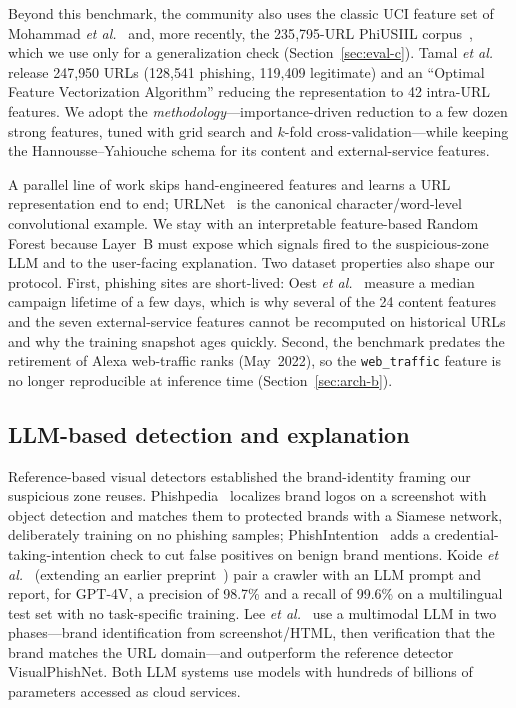 \documentclass[conference]{IEEEtran}
\begin{document}
Beyond this benchmark, the community also uses the classic UCI feature set of
Mohammad \emph{et al.}~\cite{mohammad2012assessment} and, more recently, the
235{,}795-URL PhiUSIIL corpus~\cite{prasad2024phiusiil}, which we use only for a
generalization check (Section~\ref{sec:eval-c}). Tamal \emph{et
al.}~\cite{tamal2024ofva} release 247{,}950 URLs (128{,}541 phishing, 119{,}409
legitimate) and an ``Optimal Feature Vectorization Algorithm'' reducing the representation to 42 intra-URL features. We adopt the
\emph{methodology}---importance-driven reduction to a few dozen strong features,
tuned with grid search and $k$-fold cross-validation---while keeping the
Hannousse--Yahiouche schema for its content and external-service features.

A parallel line of work skips hand-engineered features and learns a URL
representation end to end; URLNet~\cite{le2018urlnet} is the canonical
character/word-level convolutional example. We stay with an interpretable
feature-based Random Forest because Layer~B must expose which signals fired to the
suspicious-zone LLM and to the user-facing explanation. Two dataset properties
also shape our protocol. First, phishing sites are short-lived: Oest \emph{et
al.}~\cite{oest2020sunrise} measure a median campaign lifetime of a few days,
which is why several of the 24 content features and the seven external-service
features cannot be recomputed on historical URLs and why the training snapshot
ages quickly. Second, the benchmark predates the retirement of Alexa web-traffic
ranks (May~2022), so the \texttt{web\_traffic} feature is no longer reproducible
at inference time (Section~\ref{sec:arch-b}).

\subsection{LLM-based detection and explanation}
Reference-based visual detectors established the brand-identity framing our
suspicious zone reuses. Phishpedia~\cite{lin2021phishpedia} localizes brand logos
on a screenshot with object detection and matches them to protected brands with a
Siamese network, deliberately training on no phishing samples;
PhishIntention~\cite{liu2022phishintention} adds a credential-taking-intention
check to cut false positives on benign brand mentions. Koide \emph{et
al.}~\cite{koide2024chatphishdetector} (extending an earlier
preprint~\cite{koide2023chatgpt}) pair a crawler with an LLM prompt and report,
for GPT-4V, a precision of 98.7\% and a recall of 99.6\% on a multilingual test
set with no task-specific training. Lee \emph{et al.}~\cite{lee2024multimodal}
use a multimodal LLM in two phases---brand identification from screenshot/HTML,
then verification that the brand matches the URL domain---and outperform the
reference detector VisualPhishNet. Both LLM systems use models with hundreds of
billions of parameters accessed as cloud services.
\end{document}

